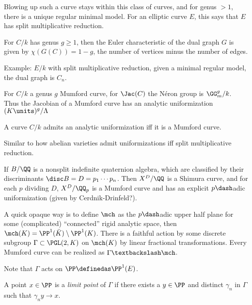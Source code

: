 Blowing up such a curve stays within this class of curves, and for genus
\(>1\), there is a unique regular minimal model. For an elliptic curve
\(E\), this says that \(E\) has split multiplicative reduction.

For \(C/k\) has genus \(g\geq 1\), then the Euler characteristic of the
dual graph \(G\) is given by \(\chi(G(C)) = 1-g\), the number of
vertices minus the number of edges.

Example: \(E/k\) with split multiplicative reduction, given a minimal
regular model, the dual graph is \(C_n\).

For \(C/k\) a genus \(g\) Mumford curve, for \(\Jac(C)\) the Néron group
is \(\GG_m^g/k\). Thus the Jacobian of a Mumford curve has an analytic
uniformization \((K\units)^g/\Lambda\)

\begin{description}
\tightlist
\item[Theorem (Main Result)]
A curve \(C/k\) admits an analytic uniformization iff it is a Mumford
curve.
\end{description}

Similar to how abelian varieties admit uniformizations iff split
multiplicative reduction.

\begin{description}
\tightlist
\item[Example]
If \(B/\QQ\) is a nonsplit indefinite quaternion algebra, which are
classified by their discriminants \(\disc B = D = p_1 \cdots p_n\). Then
\(X^D/\QQ\) is a Shimura curve, and for each \(p\) dividing \(D\),
\(X^D/\QQ_p\) is a Mumford curve and has an explicit \(p\dash\)adic
uniformization (given by Cerdnik-Drinfeld?).
\end{description}

A quick opaque way is to define \(\mch\) as the \(p\dash\)adic upper
half plane for some (complicated) ``connected'' rigid analytic space,
then \(\mch(K) = \PP^1(\bar K) \setminus \PP^1(K)\). There is a faithful
action by some discrete subgroup \(\Gamma \subset \PGL(2, K)\) on
\(\mch(K)\) by linear fractional transformations. Every Mumford curve
can be realized as \(\Gamma \textbackslash \mch\).

Note that \(\Gamma\) acts on \(\PP \definedas \PP^1(E)\).

\begin{description}
\tightlist
\item[Definition]
A point \(x\in \PP\) is a \emph{limit point} of \(\Gamma\) if there
exists a \(y\in \PP\) and distinct \(\gamma_n\) in \(\Gamma\) such that
\(\gamma_n y \to x\).
\end{description}

